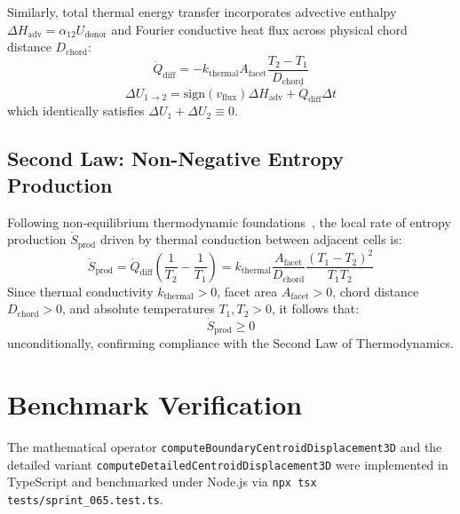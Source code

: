 \documentclass[11pt,a4paper]{article}
\theoremstyle{definition}
\begin{document}
Similarly, total thermal energy transfer incorporates advective enthalpy $\Delta H_{\text{adv}} = \alpha_{12} U_{\text{donor}}$ and Fourier conductive heat flux across physical chord distance $D_{\text{chord}}$:
\begin{equation}
\dot{Q}_{\text{diff}} = -k_{\text{thermal}} A_{\text{facet}} \frac{T_2 - T_1}{D_{\text{chord}}}
\end{equation}
\begin{equation}
\Delta U_{1\to 2} = \text{sign}(v_{\text{flux}}) \Delta H_{\text{adv}} + \dot{Q}_{\text{diff}} \Delta t
\end{equation}
which identically satisfies $\Delta U_1 + \Delta U_2 \equiv 0$.

\subsection{Second Law: Non-Negative Entropy Production}

Following non-equilibrium thermodynamic foundations~\cite{degroot1984nonequilibrium}, the local rate of entropy production $\dot{S}_{\text{prod}}$ driven by thermal conduction between adjacent cells is:
\begin{equation}
\dot{S}_{\text{prod}} = \dot{Q}_{\text{diff}} \left( \frac{1}{T_2} - \frac{1}{T_1} \right) = k_{\text{thermal}} \frac{A_{\text{facet}}}{D_{\text{chord}}} \frac{(T_1 - T_2)^2}{T_1 T_2}
\end{equation}
Since thermal conductivity $k_{\text{thermal}} > 0$, facet area $A_{\text{facet}} > 0$, chord distance $D_{\text{chord}} > 0$, and absolute temperatures $T_1, T_2 > 0$, it follows that:
\begin{equation}
\dot{S}_{\text{prod}} \ge 0
\end{equation}
unconditionally, confirming compliance with the Second Law of Thermodynamics.

\section{Benchmark Verification}

The mathematical operator \texttt{computeBoundaryCentroidDisplacement3D} and the detailed variant \texttt{computeDetailedCentroidDisplacement3D} were implemented in TypeScript and benchmarked under Node.js via \texttt{npx tsx tests/sprint\_065.test.ts}.
\end{document}
